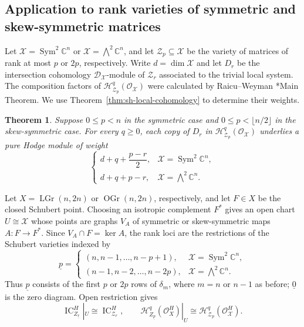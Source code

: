 \documentclass[12pt]{amsart}
\newtheorem{theorem}{Theorem}[section]
\theoremstyle{definition}
\numberwithin{equation}{section}
\begin{document}
\subsection{Application to rank varieties of symmetric and skew-symmetric matrices}
\label{sec:matrix-applications}

Let $\mathscr X=\operatorname{Sym}^2\mathbb C^n$ or
$\mathscr X=\bigwedge^2\mathbb C^n$, and let
$\mathscr Z_p\subseteq\mathscr X$ be the variety of matrices of
rank at most $p$ or $2p$, respectively. Write
$d=\dim\mathscr X$ and let $D_r$ be the intersection cohomology
$\mathscr D_{\mathscr X}$-module of $\mathscr Z_r$ associated
to the trivial local system. The composition factors of
$\mathscr H^q_{\mathscr Z_p}(\mathscr O_{\mathscr X})$
were calculated by Raicu--Weyman
\cite{raicu2016local}*{Main Theorem}. We use
Theorem~\ref{thm:sh-local-cohomology} to determine their weights.

\begin{theorem}\label{thm:matrix-rank-varieties}
Suppose $0\leq p<n$ in the symmetric case and
$0\leq p<\lfloor n/2\rfloor$ in the skew-symmetric case.
For every $q\geq0$, each copy of $D_r$ in
$\mathscr H^q_{\mathscr Z_p}(\mathscr O_{\mathscr X})$
underlies a pure Hodge module of weight
\begin{equation}\label{eq:matrix-weight-factor}
\begin{cases}
d+q+\dfrac{p-r}{2},&\mathscr X=\operatorname{Sym}^2\mathbb C^n,\\[4pt]
d+q+p-r,&\mathscr X=\bigwedge^2\mathbb C^n.
\end{cases}
\end{equation}
\end{theorem}

Let $X=\operatorname{LGr}(n,2n)$ or $\operatorname{OGr}(n,2n)$, respectively, and let $F\in X$
be the closed Schubert point. Choosing an isotropic complement
$F^*$ gives an open chart $U\cong\mathscr X$ whose points are
graphs $V_A$ of symmetric or skew-symmetric maps $A:F\to F^*$.
Since $V_A\cap F=\ker A$, the rank loci are the restrictions of
the Schubert varieties indexed by
\begin{equation}\label{eq:matrix-rank-diagrams}
\underline p=
\begin{cases}
(n,n-1,\ldots,n-p+1),&\mathscr X=\operatorname{Sym}^2\mathbb C^n,\\
(n-1,n-2,\ldots,n-2p),&\mathscr X=\bigwedge^2\mathbb C^n.
\end{cases}
\end{equation}
Thus $\underline p$ consists of the first $p$ or $2p$ rows of
$\delta_m$, where $m=n$ or $n-1$ as before; $\underline0$ is
the zero diagram. Open restriction gives
\begin{equation}\label{eq:matrix-open-restriction}
\operatorname{IC}_{Z_{\underline r}}^H|_U
 \cong\operatorname{IC}_{\mathscr Z_r}^H,
\qquad
\mathscr H^q_{Z_{\underline p}}(\mathscr O_X^H)|_U
 \cong\mathscr H^q_{\mathscr Z_p}(\mathscr O_{\mathscr X}^H).
\end{equation}
\end{document}
